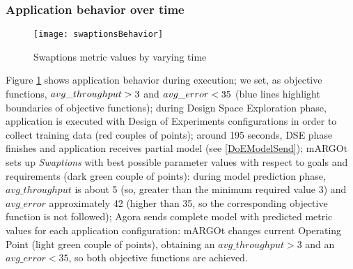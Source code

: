\subsubsection{Application behavior over time}

\begin{figure}[htb]

    \centering
    
    \texttt{[image: swaptionsBehavior]}
    
    \caption{Swaptions metric values by varying time}
    
    \label{fig::sw::beh}
    
\end{figure}

Figure \ref{fig::sw::beh} shows application behavior during execution; we set, as objective functions, $avg\_\-throughput > 3$ and $avg\_\-error < 35$ (blue lines highlight boundaries of objective functions); during Design Space Exploration phase, application is executed with Design of Experiments configurations in order to collect training data (red couples of points); around 195 seconds, DSE phase finishes and application receives partial model (see \ref{DoEModelSend}); mARGOt sets up \textit{Swaptions} with best possible parameter values with respect to goals and requirements (dark green couple of points): during model prediction phase, $avg\_throughput$ is about 5 (so, great\-er than the minimum required value 3) and $avg\_error$ approximately 42 (higher than 35, so the corresponding objective function is not followed); Agora sends complete model with predicted metric values for each application configuration: mARGOt changes current Operating Point (light green couple of points), obtaining an $avg\_throughput > 3$ and an $avg\_error < 35$, so both objective functions are achieved. 
